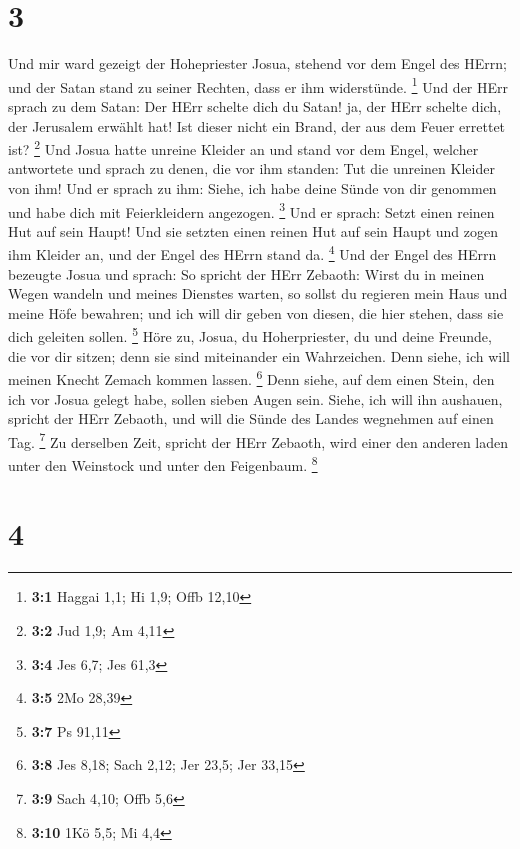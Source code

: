 \hypertarget{section-2}{%
\section{3}\label{section-2}}

 Und mir ward gezeigt der Hohepriester Josua, stehend vor
dem Engel des HErrn; und der Satan stand zu seiner Rechten, dass er ihm
widerstünde. \footnote{\textbf{3:1} Haggai 1,1; Hi 1,9; Offb 12,10}
 Und der HErr sprach zu dem Satan: Der HErr schelte dich du
Satan! ja, der HErr schelte dich, der Jerusalem erwählt hat! Ist dieser
nicht ein Brand, der aus dem Feuer errettet ist? \footnote{\textbf{3:2}
  Jud 1,9; Am 4,11}  Und Josua hatte unreine Kleider an und
stand vor dem Engel,  welcher antwortete und sprach zu
denen, die vor ihm standen: Tut die unreinen Kleider von ihm! Und er
sprach zu ihm: Siehe, ich habe deine Sünde von dir genommen und habe
dich mit Feierkleidern angezogen. \footnote{\textbf{3:4} Jes 6,7; Jes
  61,3}  Und er sprach: Setzt einen reinen Hut auf sein
Haupt! Und sie setzten einen reinen Hut auf sein Haupt und zogen ihm
Kleider an, und der Engel des HErrn stand da. \footnote{\textbf{3:5} 2Mo
  28,39}  Und der Engel des HErrn bezeugte Josua und sprach:
 So spricht der HErr Zebaoth: Wirst du in meinen Wegen
wandeln und meines Dienstes warten, so sollst du regieren mein Haus und
meine Höfe bewahren; und ich will dir geben von diesen, die hier stehen,
dass sie dich geleiten sollen. \footnote{\textbf{3:7} Ps 91,11}
 Höre zu, Josua, du Hoherpriester, du und deine Freunde, die
vor dir sitzen; denn sie sind miteinander ein Wahrzeichen. Denn siehe,
ich will meinen Knecht Zemach kommen lassen. \footnote{\textbf{3:8} Jes
  8,18; Sach 2,12; Jer 23,5; Jer 33,15}  Denn siehe, auf dem
einen Stein, den ich vor Josua gelegt habe, sollen sieben Augen sein.
Siehe, ich will ihn aushauen, spricht der HErr Zebaoth, und will die
Sünde des Landes wegnehmen auf einen Tag. \footnote{\textbf{3:9} Sach
  4,10; Offb 5,6}  Zu derselben Zeit, spricht der HErr
Zebaoth, wird einer den anderen laden unter den Weinstock und unter den
Feigenbaum. \footnote{\textbf{3:10} 1Kö 5,5; Mi 4,4}

\hypertarget{section-3}{%
\section{4}\label{section-3}}

